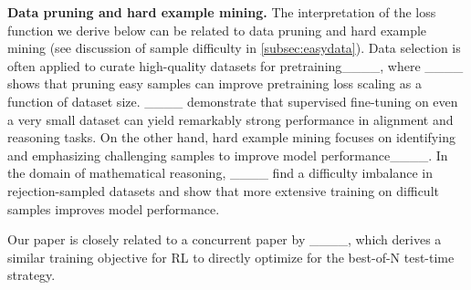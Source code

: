 \textbf{Data pruning and hard example mining.} The interpretation of the loss function we derive below can be related to data pruning and hard example mining (see discussion of sample difficulty in \cref{subsec:easydata}). Data selection is often applied to curate high-quality datasets for pretraining____, where ____ shows that pruning easy samples can improve pretraining loss scaling as a function of dataset size. ____ demonstrate that supervised fine-tuning on even a very small dataset can yield remarkably strong performance in alignment and reasoning tasks.
%
On the other hand, hard example mining focuses on identifying and emphasizing challenging samples to improve model performance____.
%
In the domain of mathematical reasoning, ____ find a difficulty imbalance in rejection-sampled datasets and show that more extensive training on difficult samples improves model performance.
%

Our paper is closely related to a concurrent paper by ____, which derives a similar training objective for RL to directly optimize for the best-of-N test-time strategy.